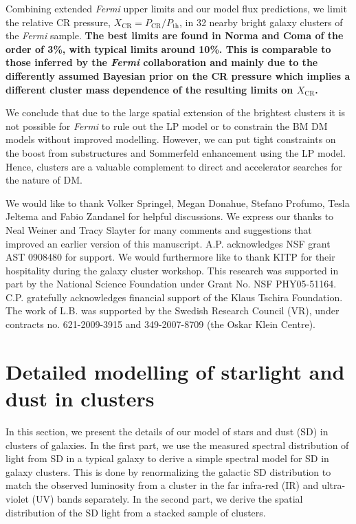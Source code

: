 \documentclass[10pt,aps,pra,reprint,amsmath,amsfonts,amssymb,showpacs,nofootinbib,floatfix]{revtex4-1}
\def\C#1{{\bf #1}}
\newcommand{\Fermi}{{\em Fermi}\xspace}
\newcommand{\rmn}{\mathrm}
\newcommand{\CR}{\rmn{CR}}
\begin{document}
Combining extended \Fermi upper limits and our model flux predictions,
we limit the relative CR pressure, $X_\CR = P_\CR/P_\rmn{th}$, in 32
nearby bright galaxy clusters of the \Fermi sample. \C{The best limits
  are found in Norma and Coma of the order of 3\%, with typical limits
  around 10\%. This is comparable to those inferred by the \Fermi
  collaboration \citep{2010ApJ...717L..71A} and mainly due to the
  differently assumed Bayesian prior on the CR pressure which implies
  a different cluster mass dependence of the resulting limits on
  $X_\CR$.}

We conclude that due to the large spatial extension of the brightest
clusters it is not possible for \Fermi to rule out the LP model or to
constrain the BM DM models without improved modelling. However, we can
put tight constraints on the boost from substructures and Sommerfeld
enhancement using the LP model. Hence, clusters are a valuable
complement to direct and accelerator searches for the nature of DM.



\smallskip We would like to thank Volker Springel, Megan Donahue,
Stefano Profumo, Tesla Jeltema and Fabio Zandanel for helpful
discussions. We express our thanks to Neal Weiner and Tracy Slayter
for many comments and suggestions that improved an earlier version of
this manuscript. A.P. acknowledges NSF grant AST 0908480 for
support. We would furthermore like to thank KITP for their hospitality
during the galaxy cluster workshop. This research was supported in
part by the National Science Foundation under Grant No. NSF
PHY05-51164. C.P. gratefully acknowledges financial support of the
Klaus Tschira Foundation. The work of L.B. was supported by the
Swedish Research Council (VR), under contracts no. 621-2009-3915 and
349-2007-8709 (the Oskar Klein Centre).


\vspace{-0.7cm}

%
%

\appendix

\section{Detailed modelling of starlight and dust in clusters}
\label{sect:SD}
In this section, we present the details of our model of stars and dust
(SD) in clusters of galaxies. In the first part, we use the measured
spectral distribution of light from SD in a typical galaxy to derive a
simple spectral model for SD in galaxy clusters. This is done by
renormalizing the galactic SD distribution to match the observed luminosity
from a cluster in the far infra-red (IR) and ultra-violet (UV) bands
separately. In the second part, we derive the spatial distribution of
the SD light from a stacked sample of clusters.
\end{document}
